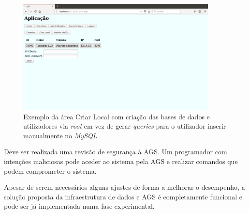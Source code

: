 \documentclass[11pt,twoside,a4paper]{report}
\begin{document}
\begin{figure}[H]
	\begin{center}
		\includegraphics[width=0.9\textwidth]{futuro01} %
		\caption{Exemplo da área Criar Local com criação das bases de dados e utilizadores via \textit{root} em vez de gerar \textit{queries} para o utilizador inserir manualmente no \textit{MySQL}}
		\label{fig:conclusoes5}
	\end{center}
\end{figure}
Deve ser realizada uma revisão de segurança à AGS. Um programador com intenções maliciosas pode aceder ao sistema pela AGS e realizar comandos que podem comprometer o sistema.\par 
Apesar de serem necessários alguns ajustes de forma a melhorar o desempenho, a solução proposta da infraestrutura de dados e AGS é completamente funcional e pode ser já implementada numa fase experimental.
\end{document}
